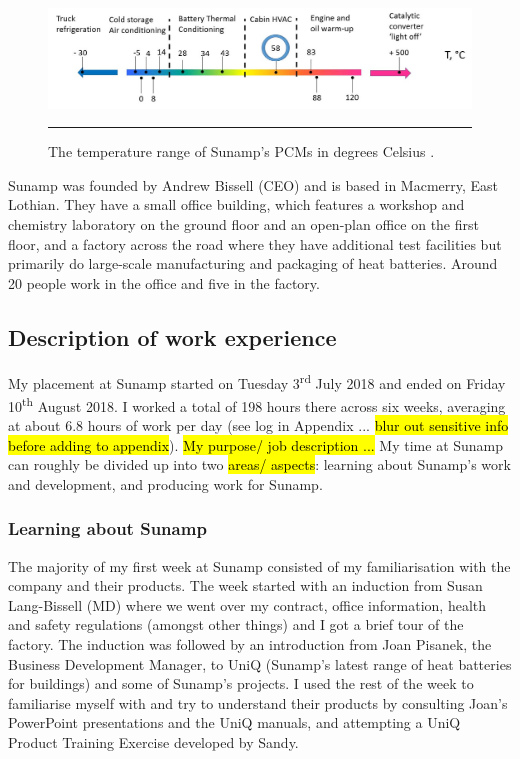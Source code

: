 \begin{figure}[htbp]
	\centering
	\includegraphics[width=\textwidth]{figures/temperature-range-of-PCMs.jpg}
	\rule{\textwidth}{0.5pt} %
	\caption{The temperature range of Sunamp's PCMs in degrees Celsius \citep{SunampAutomotive}.}
	\label{pcm_temp_range}
\end{figure}

Sunamp was founded by Andrew Bissell (CEO) and is based in Macmerry, East Lothian.
They have a small office building, which features a workshop and chemistry laboratory on the ground floor and an open-plan office on the first floor, and a factory across the road where they have additional test facilities but primarily do large-scale manufacturing and packaging of heat batteries.
Around 20 people work in the office and five in the factory.



\subsection{Description of work experience}

My placement at Sunamp started on Tuesday 3\textsuperscript{rd} July 2018 and ended on Friday 10\textsuperscript{th} August 2018.
I worked a total of 198 hours there across six weeks, averaging at about 6.8 hours of work per day (see log in Appendix ... \hl{blur out sensitive info before adding to appendix}).
\hl{My purpose/ job description ...}
My time at Sunamp can roughly be divided up into two \hl{areas/ aspects}: learning about Sunamp's work and development, and producing work for Sunamp.


\subsubsection{Learning about Sunamp}

The majority of my first week at Sunamp consisted of my familiarisation with the company and their products.
The week started with an induction from Susan Lang-Bissell (MD) where we went over my contract, office information, health and safety regulations (amongst other things) and I got a brief tour of the factory.
The induction was followed by an introduction from Joan Pisanek, the Business Development Manager, to UniQ (Sunamp's latest range of heat batteries for buildings) and some of Sunamp's projects.
I used the rest of the week to familiarise myself with and try to understand their products by consulting Joan's PowerPoint presentations and the UniQ manuals,
and attempting a UniQ Product Training Exercise developed by Sandy.

